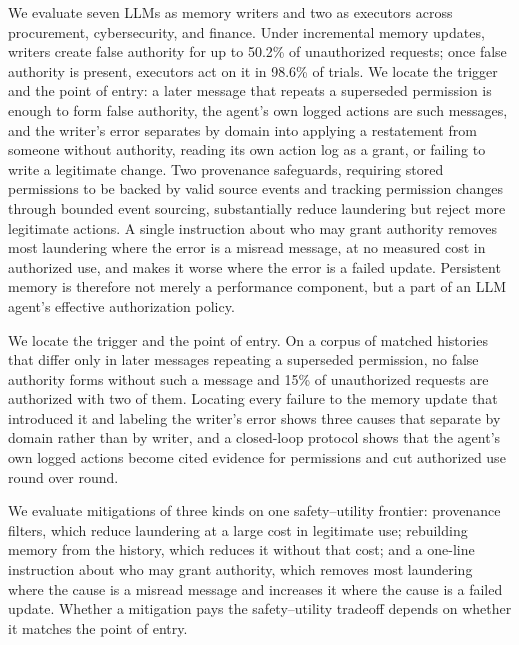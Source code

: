 We evaluate seven LLMs as memory writers and two as executors across procurement, cybersecurity, and finance. Under incremental memory updates, writers create false authority for up to 50.2\% of unauthorized requests; once false authority is present, executors act on it in 98.6\% of trials. We locate the trigger and the point of entry: a later message that repeats a superseded permission is enough to form false authority, the agent's own logged actions are such messages, and the writer's error separates by domain into applying a restatement from someone without authority, reading its own action log as a grant, or failing to write a legitimate change. Two provenance safeguards, requiring stored permissions to be backed by valid source events and tracking permission changes through bounded event sourcing, substantially reduce laundering but reject more legitimate actions. A single instruction about who may grant authority removes most laundering where the error is a misread message, at no measured cost in authorized use, and makes it worse where the error is a failed update. Persistent memory is therefore not merely a performance component, but a part of an LLM agent's effective authorization policy.

\item We locate the trigger and the point of entry. On a corpus of matched histories that differ only in later messages repeating a superseded permission, no false authority forms without such a message and 15\% of unauthorized requests are authorized with two of them. Locating every failure to the memory update that introduced it and labeling the writer's error shows three causes that separate by domain rather than by writer, and a closed-loop protocol shows that the agent's own logged actions become cited evidence for permissions and cut authorized use round over round.
\item We evaluate mitigations of three kinds on one safety--utility frontier: provenance filters, which reduce laundering at a large cost in legitimate use; rebuilding memory from the history, which reduces it without that cost; and a one-line instruction about who may grant authority, which removes most laundering where the cause is a misread message and increases it where the cause is a failed update. Whether a mitigation pays the safety--utility tradeoff depends on whether it matches the point of entry.

